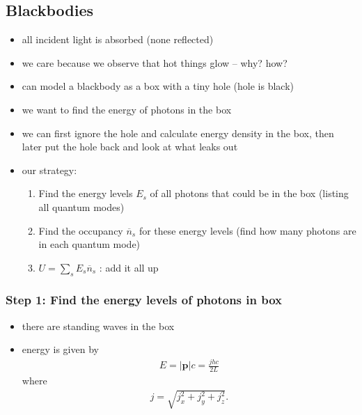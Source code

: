 \documentclass[10pt]{article}
\begin{document}
\subsection{Blackbodies}
\begin{itemize}
    \item all incident light is absorbed (none reflected)
    \item we care because we observe that hot things glow -- why? how?
    \item can model a blackbody as a box with a tiny hole (hole is black)
    \item we want to find the energy of photons in the box 
    \item we can first ignore the hole and calculate energy density in the box, then later put the hole back and look at what leaks out 
    \item our strategy:
        \begin{enumerate}
            \item Find the energy levels $E_s$ of all photons that could be in the box (listing all quantum modes) 
            \item Find the occupancy $\overline{n}_s$ for these energy levels (find how many photons are in each quantum mode)
            \item $U = \sum_{s} E_s \overline{n}_s$ : add it all up
        \end{enumerate}
\end{itemize}
\subsubsection*{Step 1: Find the energy levels of photons in box}
\begin{itemize}
    \item there are standing waves in the box 
    \item energy is given by 
        \begin{gather*}
            E = |\bm{p}|c = \frac{jhc}{2L} 
        \end{gather*}
        where
        \begin{gather*}
            j = \sqrt{j_x^2 + j_y^2 + j_z^2} 
        .\end{gather*}
\end{itemize}
\end{document}
